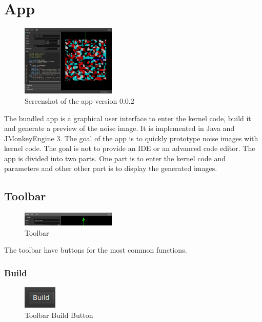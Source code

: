 \section{App}

\begin{figure}
\centering
\includegraphics[width=0.4\textwidth]{Screenshot_20211121_152848.png}
\caption{Screenshot of the app version 0.0.2}\label{fig:app_screenshot}
\end{figure}

The bundled app is a graphical user interface to enter the kernel code, build
it and generate a preview of the noise image. It is implemented 
in Java and JMonkeyEngine 3. The goal of the app is to quickly prototype
noise images with kernel code. The goal is not to provide an IDE or an advanced
code editor. The app is divided into two parts. One part is to enter the kernel code and
parameters and other other part is to display the generated images.

\subsection{Toolbar}

\begin{figure}[h]
\centering
\includegraphics[width=0.4\textwidth]{imgs/toolbar-screenshot-0.png}
\caption{Toolbar}\label{fig:toolbar-screenshot-0}
\end{figure}

The toolbar have buttons for the most common functions.

\subsubsection{Build}

\begin{figure}[h]
\centering
\includegraphics{imgs/toolbar-build-0.png}
\caption{Toolbar Build Button}\label{fig:toolbar-build-0}
\end{figure}

